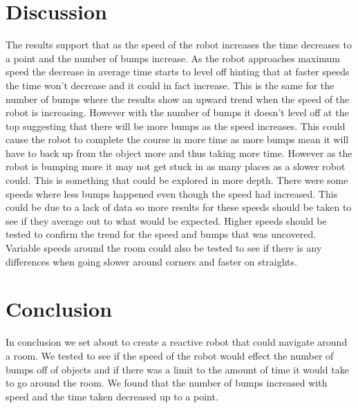 \documentclass[12pt, letterpaper]{article}
\begin{document}
\begin{multicols}{2}
\section{Discussion}
The results support that as the speed of the robot increases the time decreases to a point and the number of bumps increase. As the robot approaches maximum speed the decrease in average time starts to level off hinting that at faster speeds the time won't decrease and it could in fact increase. This is the same for the number of bumps where the results show an upward trend when the speed of the robot is increasing. However with the number of bumps it doesn't level off at the top suggesting that there will be more bumps as the speed increases. This could cause the robot to complete the course in more time as more bumps 
mean it will have to back up from the object more and thus taking more time. However as the robot is bumping more it may not get stuck in as many places as a slower robot could. This is something that could be explored in more depth. There were some speeds where less bumps happened even though the speed had increased. This could be due to a lack of data so more results for these speeds should be taken to see if they average out to what would be expected. Higher speeds should be tested to confirm the trend for the speed and bumps that was uncovered. Variable speeds around the room could also be tested to see if there is any differences when going slower around corners and faster on straights.
\section{Conclusion}
In conclusion we set about to create a reactive robot that could navigate around a room. We tested to see if the speed of the robot would effect the number of bumps off of objects and if there was a limit to the amount of time it would take to go around the room. We found that the number of bumps increased with speed and the time taken decreased up to a point. 
\newpage
\end{multicols}


\end{document}
